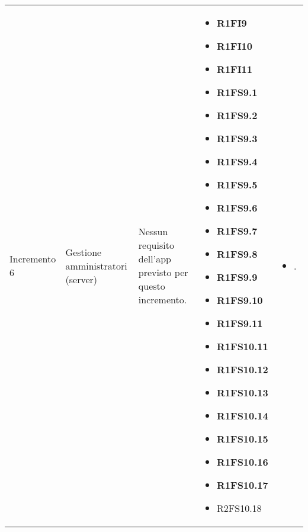 {\begin{longtable}{C{2.5cm} C{3.2cm} C{2.8cm} C{2.8cm} C{2.8cm}}
Incremento 6 & Gestione amministratori (server) & 
    Nessun requisito dell'app previsto per questo incremento.
    & \begin{itemize} 
    \item[ ] \textbf{R1FI9}
    \item[ ] \textbf{R1FI10}
    \item[ ] \textbf{R1FI11}
    \item[ ] \textbf{R1FS9.1}
    \item[ ] \textbf{R1FS9.2}
    \item[ ] \textbf{R1FS9.3}
    \item[ ] \textbf{R1FS9.4}
    \item[ ] \textbf{R1FS9.5}
    \item[ ] \textbf{R1FS9.6}
    \item[ ] \textbf{R1FS9.7}
    \item[ ] \textbf{R1FS9.8}
    \item[ ] \textbf{R1FS9.9}
    \item[ ] \textbf{R1FS9.10}
    \item[ ] \textbf{R1FS9.11}
    \item[ ] \textbf{R1FS10.11}
    \item[ ] \textbf{R1FS10.12}
    \item[ ] \textbf{R1FS10.13}
    \item[ ] \textbf{R1FS10.14}
    \item[ ] \textbf{R1FS10.15}
    \item[ ] \textbf{R1FS10.16}
    \item[ ] \textbf{R1FS10.17}
    \item[ ] R2FS10.18
\end{itemize} & \begin{itemize}
    \item[ ] .
\end{itemize}\\

\end{longtable}
}